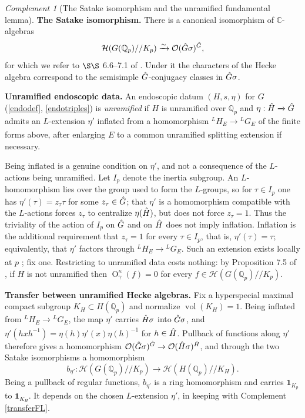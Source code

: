 \documentclass[11pt,a4paper]{article}
\theoremstyle{definition}
\theoremstyle{plain}
\theoremstyle{remark}
\newtheorem{Rc}[shared]{Complement}
\theoremstyle{plain}
\DeclareMathOperator{\vol}{vol}
\DeclareMathOperator{\Or}{O}
\begin{document}
\begin{Rc}[The Satake isomorphism and the unramified fundamental lemma]
    \textbf{The Satake isomorphism.} There is a canonical isomorphism of $\mathbb{C}$-algebras
    $$\mathcal{H}(G(\mathbb{Q}_p)//K_p)\xrightarrow{\sim}\mathcal{O}(\Hat{G}\sigma)^{\Hat{G}},$$
    for which we refer to $\S\S$ 6.6--7.1 of \cite{MR546608}. Under it the characters of the Hecke algebra correspond to the semisimple $\Hat{G}$-conjugacy classes in $\Hat{G}\sigma$.

    \textbf{Unramified endoscopic data.} An endoscopic datum $(H,s,\eta)$ for $G$ (\ref{endodef}, \ref{endotriples}) is \textit{unramified} if $H$ is unramified over $\mathbb{Q}_p$ and $\eta:\Hat{H}\xrightarrow[]{}\Hat{G}$ admits an $L$-extension $\eta'$ inflated from a homomorphism ${}^L H_E\xrightarrow[]{}{}^L G_E$ of the finite forms above, after enlarging $E$ to a common unramified splitting extension if necessary.

    Being inflated is a genuine condition on $\eta'$, and not a consequence of the $L$-actions being unramified. Let $I_p$ denote the inertia subgroup. An $L$-homomorphism lies over the group used to form the $L$-groups, so for $\tau\in I_p$ one has $\eta'(\tau)=z_{\tau}\tau$ for some $z_{\tau}\in\Hat{G}$; that $\eta'$ is a homomorphism compatible with the $L$-actions forces $z_{\tau}$ to centralize $\eta(\Hat{H})$, but does not force $z_{\tau}=1$. Thus the triviality of the action of $I_p$ on $\Hat{G}$ and on $\Hat{H}$ does not imply inflation. Inflation is the additional requirement that $z_{\tau}=1$ for every $\tau\in I_p$, that is, $\eta'(\tau)=\tau$; equivalently, that $\eta'$ factors through ${}^L H_E\xrightarrow[]{}{}^L G_E$. Such an extension exists locally at $p$ \cite[p.~180]{MR1044820}; fix one. Restricting to unramified data costs nothing: by Proposition 7.5 of \cite{MR858284}, if $H$ is not unramified then $\Or^{\kappa}_{\gamma}(f)=0$ for every $f\in\mathcal{H}(G(\mathbb{Q}_p)//K_p)$.

    \textbf{Transfer between unramified Hecke algebras.} Fix a hyperspecial maximal compact subgroup $K_H\subset H(\mathbb{Q}_p)$ and normalize $\vol(K_H)=1$. Being inflated from ${}^L H_E\xrightarrow[]{}{}^L G_E$, the map $\eta'$ carries $\Hat{H}\sigma$ into $\Hat{G}\sigma$, and $\eta'(hxh^{-1})=\eta(h)\eta'(x)\eta(h)^{-1}$ for $h\in\Hat{H}$. Pullback of functions along $\eta'$ therefore gives a homomorphism $\mathcal{O}(\Hat{G}\sigma)^{\Hat{G}}\xrightarrow[]{}\mathcal{O}(\Hat{H}\sigma)^{\Hat{H}}$, and through the two Satake isomorphisms a homomorphism
    $$b_{\eta'}:\mathcal{H}(G(\mathbb{Q}_p)//K_p)\xrightarrow[]{}\mathcal{H}(H(\mathbb{Q}_p)//K_H).$$
    Being a pullback of regular functions, $b_{\eta'}$ is a ring homomorphism and carries $\mathbf{1}_{K_p}$ to $\mathbf{1}_{K_H}$. It depends on the chosen $L$-extension $\eta'$, in keeping with Complement \ref{transferFL}.


\end{Rc}
\end{document}

